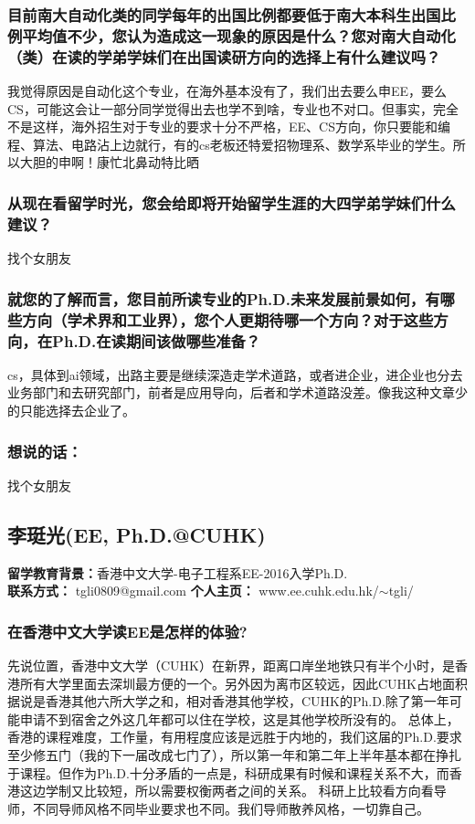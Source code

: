 \documentclass[a4paper,UTF8]{book}
\begin{document}
    \subsubsection*{目前南大自动化类的同学每年的出国比例都要低于南大本科生出国比例平均值不少，您认为造成这一现象的原因是什么？您对南大自动化（类）在读的学弟学妹们在出国读研方向的选择上有什么建议吗？}
    我觉得原因是自动化这个专业，在海外基本没有了，我们出去要么申EE，要么CS，可能这会让一部分同学觉得出去也学不到啥，专业也不对口。但事实，完全不是这样，海外招生对于专业的要求十分不严格，EE、CS方向，你只要能和编程、算法、电路沾上边就行，有的cs老板还特爱招物理系、数学系毕业的学生。所以大胆的申啊！康忙北鼻动特比晒
    \subsubsection*{从现在看留学时光，您会给即将开始留学生涯的大四学弟学妹们什么建议？}
    找个女朋友
    \subsubsection*{就您的了解而言，您目前所读专业的Ph.D.未来发展前景如何，有哪些方向（学术界和工业界），您个人更期待哪一个方向？对于这些方向，在Ph.D.在读期间该做哪些准备？}
    cs，具体到ai领域，出路主要是继续深造走学术道路，或者进企业，进企业也分去业务部门和去研究部门，前者是应用导向，后者和学术道路没差。像我这种文章少的只能选择去企业了。
    \subsubsection{想说的话：}
    找个女朋友
        
\clearpage
\subsection{李珽光(EE, Ph.D.@CUHK)}
    \textbf{留学教育背景：}香港中文大学-电子工程系EE-2016入学Ph.D.\\
    \textbf{联系方式：} tgli0809@gmail.com
    \textbf{个人主页：} www.ee.cuhk.edu.hk/$\sim$tgli/

    \subsubsection*{在香港中文大学读EE是怎样的体验?}
    先说位置，香港中文大学（CUHK）在新界，距离口岸坐地铁只有半个小时，是香港所有大学里面去深圳最方便的一个。另外因为离市区较远，因此CUHK占地面积据说是香港其他六所大学之和，相对香港其他学校，CUHK的Ph.D.除了第一年可能申请不到宿舍之外这几年都可以住在学校，这是其他学校所没有的。
    总体上，香港的课程难度，工作量，有用程度应该是远胜于内地的，我们这届的Ph.D.要求至少修五门（我的下一届改成七门了），所以第一年和第二年上半年基本都在挣扎于课程。但作为Ph.D.十分矛盾的一点是，科研成果有时候和课程关系不大，而香港这边学制又比较短，所以需要权衡两者之间的关系。
    科研上比较看方向看导师，不同导师风格不同毕业要求也不同。我们导师散养风格，一切靠自己。
\end{document}
